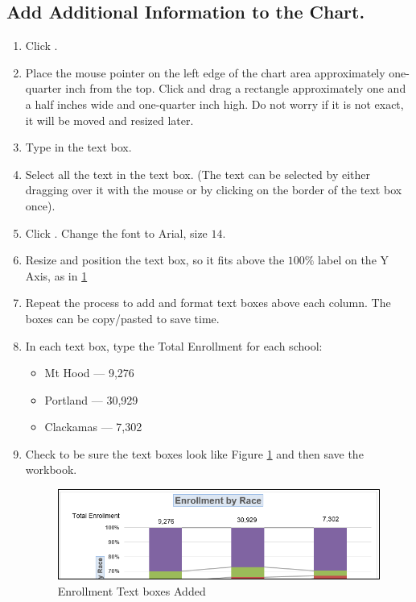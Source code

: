 \subsection{Add Additional Information to the Chart.}

\begin{enumerate}
	\item Click .
	\item Place the mouse pointer on the left edge of the chart area approximately one-quarter inch from the top. Click and drag a rectangle approximately one and a half inches wide and one-quarter inch high. Do not worry if it is not exact, it will be moved and resized later.
	\item Type  in the text box.
	\item Select all the text in the text box. (The text can be selected by either dragging over it with the mouse or by clicking on the border of the text box once). 
	\item Click . Change the font to Arial, size $ 14 $.
	\item Resize and position the text box, so it fits above the $ 100\% $ label on the Y Axis, as in \ref{04:fig43}
	\item Repeat the process to add and format text boxes above each column. The boxes can be copy/pasted to save time.
	\item In each text box, type the Total Enrollment for each school:

	\begin{itemize}
		\item Mt Hood --- 9,276
		\item Portland --- 30,929
		\item Clackamas --- 7,302
	\end{itemize}

	\item Check to be sure the text boxes look like Figure \ref{04:fig43} and then save the  workbook.

	\begin{figure}[H]
		\centering
		\includegraphics[width=\maxwidth{.95\linewidth}]{gfx/ch04_fig43}
		\caption{Enrollment Text boxes Added}
		\label{04:fig43}
	\end{figure}


\end{enumerate}
